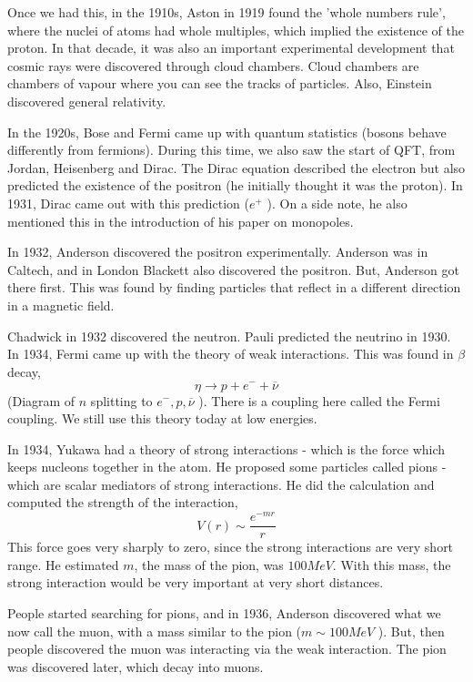 \documentclass[11pt, oneside]{article}   	%
\theoremstyle{slanted}
\begin{document}
Once we had this, in the 1910s, Aston in 1919 
found the 'whole numbers rule',
where the nuclei of atoms had whole multiples, which implied the existence of the proton. 
In that decade, it was also an important 
experimental development 
that cosmic rays were discovered through cloud chambers. 
Cloud chambers are chambers of vapour where 
you can see the tracks of particles. 
Also, Einstein discovered general relativity. 

In the 1920s, Bose and Fermi 
came up with quantum statistics (bosons behave differently from fermions). 
During this time, we also saw 
the start of QFT, from Jordan, Heisenberg and Dirac. 
The Dirac equation described the electron but also predicted
the existence of the positron (he initially thought it 
was the proton). 
In 1931, Dirac came out with this prediction ($ e ^ + $  ). 
On a side note, he also mentioned this in the introduction 
of his paper on monopoles. 

In 1932, Anderson discovered the positron 
experimentally. 
Anderson was in Caltech, and in London Blackett also 
discovered the positron. But, Anderson got there first. 
This was found by finding particles that reflect in a 
different direction in a magnetic field. 
 
Chadwick in 1932 discovered the neutron. 
Pauli predicted the neutrino in 1930.  
In 1934, Fermi came up with the theory 
of weak interactions. 
This was found in $ \beta $ decay, 
\[
 \eta \to p  + e ^ - + \overline{ \nu } 
\] (Diagram of $ n $ splitting to $ e ^  - , p , \overline{ \nu }  $ ). 
There is a coupling here 
called the Fermi coupling. 
We still use this theory today at low energies. 

In 1934, Yukawa had a theory of strong interactions - which 
is the force which keeps nucleons together 
in the atom. 
He proposed some particles called pions -
 which are scalar mediators 
 of strong interactions. 
He did the calculation and computed 
the strength of the interaction, 
\[
 V \left( r  \right)   \sim  \frac{ e ^{   - m r } }{ r } 
\] This force goes very sharply to zero, 
since the strong interactions are very short range. 
He estimated $ m $, the mass of the pion, was 
 $ 100 Me V $. 
 With this mass, the strong interaction 
 would be very important at very short distances. 


People started searching for pions, and in 
1936, Anderson discovered what we now call the muon, 
with a mass similar to the pion ($ m \sim 100 M eV $  ). 
But, then people discovered the muon was interacting 
via the weak interaction. 
The pion was discovered later, 
which decay into muons. 
\end{document}
